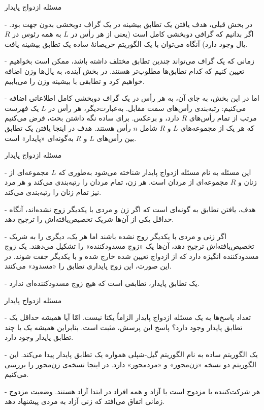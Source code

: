 \begin{itemframe}{مسئله ازدواج پایدار}
\item[-]
در بخش قبلی، هدف یافتن یک تطابق بیشینه در یک گراف دوبخشی بدون جهت بود.
اگر بدانیم که گرافی دوبخشی کامل است (یعنی از هر رأس در $L$ به همه رئوس در $R$ یال وجود دارد) آنگاه می‌توان با یک الگوریتم حریصانهٔ ساده یک تطابق بیشینه یافت.
\item[-]
زمانی که یک گراف می‌تواند چندین تطابق مختلف داشته باشد، ممکن است بخواهیم تعیین کنیم که کدام تطابق‌ها مطلوب‌تر هستند. در بخش آینده، به یال‌ها وزن اضافه خواهیم کرد و تطابقی با بیشینه وزن را می‌یابیم.
\item[-]
اما در این بخش، به جای آن، به هر رأس در یک گراف دوبخشی کامل اطلاعاتی اضافه می‌کنیم: رتبه‌بندی رأس‌های سمت مقابل. به‌عبارت‌دیگر، هر رأس در $L$ یک فهرست مرتب از تمام رأس‌های $R$ دارد، و برعکس. برای ساده نگه داشتن بحث، فرض می‌کنیم که هر یک از مجموعه‌های $L$ و $R$ شامل $n$ رأس هستند. هدف در اینجا یافتن یک تطابق بین رأس‌های $L$ و $R$ به‌گونه‌ای «پایدار» است.
\end{itemframe}


\begin{itemframe}{مسئله ازدواج پایدار}
\item[-]
این مسئله به نام مسئله ازدواج پایدار
شناخته می‌شود به‌طوری که $L$ مجموعه‌ای از زنان و $R$ مجموعه‌ای از مردان است. هر زن، تمام مردان را  رتبه‌بندی می‌کند و هر مرد نیز تمام زنان را رتبه‌بندی می‌کند.
\item[-]
هدف، یافتن تطابق به گونه‌ای است که اگر زن و مردی با یکدیگر زوج نشده‌اند، آنگاه حداقل یکی از آن‌ها شریک تخصیص‌یافته‌اش را ترجیح دهد.
\item[-]
اگر زنی و مردی با یکدیگر زوج نشده باشند اما هر یک، دیگری را به شریک تخصیص‌یافته‌اش ترجیح دهد، آن‌ها یک «زوج مسدودکننده»
را تشکیل می‌دهند. یک زوج مسدودکننده انگیزه دارد که از ازدواج تعیین شده خارج شده و با یکدیگر جفت شوند. در این صورت، این زوج پایداری تطابق را «مسدود» می‌کنند.
\item[-]
یک تطابق پایدار، تطابقی است که هیچ زوج مسدودکننده‌ای ندارد.
\end{itemframe}


\begin{itemframe}{مسئله ازدواج پایدار}
\item[-]
تعداد پاسخ‌ها به یک مسئله ازدواج پایدار الزاماً یکتا نیست. امّا آیا همیشه حداقل یک تطابق پایدار وجود دارد؟ پاسخ این پرسش، مثبت است. بنابراین همیشه یک یا چند تطابق پایدار وجود دارد.

\item[-]
یک الگوریتم ساده به نام الگوریتم گیل-شپلی
همواره یک تطابق پایدار پیدا می‌کند. این الگوریتم دو نسخه «زن‌محور»
و «مرد‌محور»
دارد. در اینجا نسخه‌ی زن‌محور را بررسی می‌کنیم.
\item[-]
هر شرکت‌کننده یا مزدوج است یا آزاد و همه افراد در ابتدا آزاد هستند.
وضعیت مزدوج زمانی اتفاق می‌افتد که زنی آزاد به مردی پیشنهاد دهد.
\end{itemframe}


